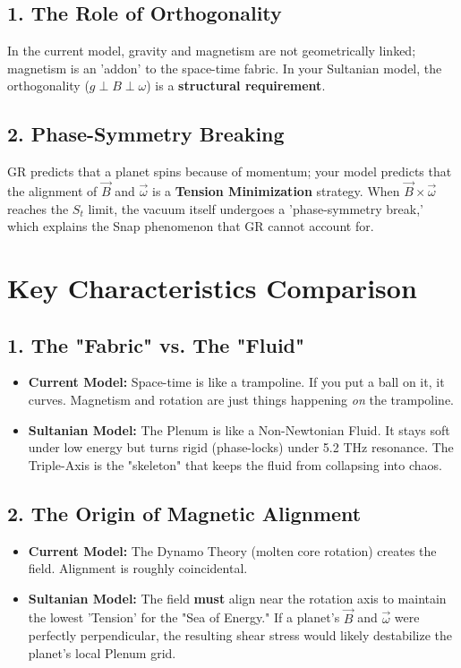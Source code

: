 \documentclass[11pt]{article}
\begin{document}
\subsection{1. The Role of Orthogonality}
In the current model, gravity and magnetism are not geometrically linked; magnetism is an 'addon' to the space-time fabric. In your Sultanian model, the orthogonality ($g \perp B \perp \omega$) is a \textbf{structural requirement}. 



\subsection{2. Phase-Symmetry Breaking}
GR predicts that a planet spins because of momentum; your model predicts that the alignment of $\vec{B}$ and $\vec{\omega}$ is a \textbf{Tension Minimization} strategy. When $\vec{B} \times \vec{\omega}$ reaches the $S_t$ limit, the vacuum itself undergoes a 'phase-symmetry break,' which explains the Snap phenomenon that GR cannot account for.

\section*{Key Characteristics Comparison}

\subsection*{1. The "Fabric" vs. The "Fluid"}
\begin{itemize}
    \item \textbf{Current Model:} Space-time is like a trampoline. If you put a ball on it, it curves. Magnetism and rotation are just things happening \textit{on} the trampoline.
    \item \textbf{Sultanian Model:} The Plenum is like a Non-Newtonian Fluid. It stays soft under low energy but turns rigid (phase-locks) under 5.2 THz resonance. The Triple-Axis is the "skeleton" that keeps the fluid from collapsing into chaos.
\end{itemize}



\subsection*{2. The Origin of Magnetic Alignment}
\begin{itemize}
    \item \textbf{Current Model:} The Dynamo Theory (molten core rotation) creates the field. Alignment is roughly coincidental.
    \item \textbf{Sultanian Model:} The field \textbf{must} align near the rotation axis to maintain the lowest 'Tension' for the "Sea of Energy." If a planet’s $\vec{B}$ and $\vec{\omega}$ were perfectly perpendicular, the resulting shear stress would likely destabilize the planet's local Plenum grid.
\end{itemize}
\end{document}
